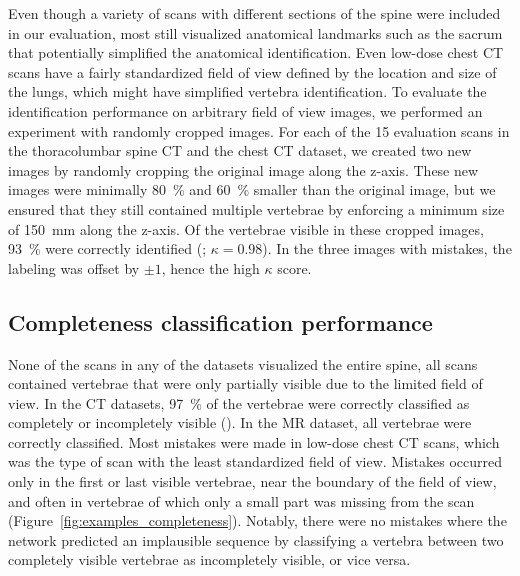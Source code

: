 \documentclass[authoryear,5p,final,times]{elsarticle}
\begin{document}
	Even though a variety of scans with different sections of the spine were included in our evaluation, most still visualized anatomical landmarks such as the sacrum that potentially simplified the anatomical identification. Even low-dose chest CT scans have a fairly standardized field of view defined by the location and size of the lungs, which might have simplified vertebra identification. To evaluate the identification performance on arbitrary field of view images, we performed an experiment with randomly cropped images. For each of the 15 evaluation scans in the thoracolumbar spine CT and the chest CT dataset, we created two new images by randomly cropping the original image along the z-axis. These new images were minimally \SI{80}{\percent} and \SI{60}{\percent} smaller than the original image, but we ensured that they still contained multiple vertebrae by enforcing a minimum size of \SI{150}{\milli\meter} along the z-axis. Of the vertebrae visible in these cropped images,  \SI{93}{\percent} were correctly identified (; $\kappa = 0.98$). In the three images with mistakes, the labeling was offset by $\pm 1$, hence the high $\kappa$ score.
	
	\subsection{Completeness classification performance}
	
	None of the scans in any of the datasets visualized the entire spine, all scans contained vertebrae that were only partially visible due to the limited field of view. In the CT datasets, \SI{97}{\percent} of the vertebrae were correctly classified as completely or incompletely visible ().  In the MR dataset, all vertebrae were correctly classified. Most mistakes were made in low-dose chest CT scans, which was the type of scan with the least standardized field of view. Mistakes occurred only in the first or last visible vertebrae, near the boundary of the field of view, and often in vertebrae of which only a small part was missing from the scan (Figure~\ref*{fig:examples_completeness}). Notably, there were no mistakes where the network predicted an implausible sequence by classifying a vertebra between two completely visible vertebrae as incompletely visible, or vice versa.
	
	\begin{figure*}[t]
		\caption{Examples of vertebra completeness classification results. Vertebrae classified as completely visible are marked in light green and vertebrae classified as incompletely visible are marked in red.  Arrows indicate misclassified vertebrae. Shown are low-dose chest CT scans (left and right) and a lumbar spine CT scan (center).}
		\label{fig:examples_completeness}
	\end{figure*}
	
\end{document}
